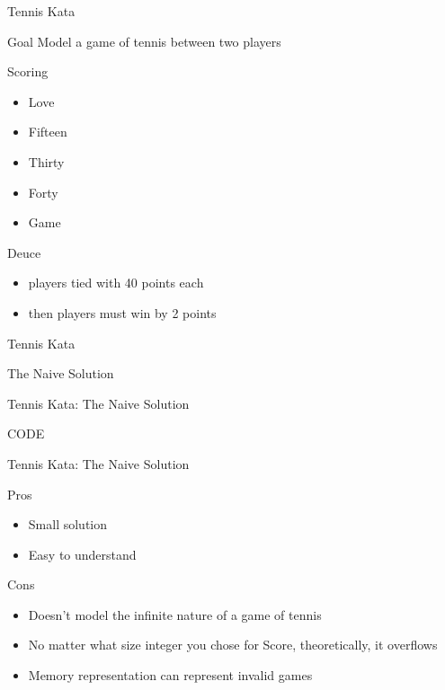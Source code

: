 \documentclass[aspectratio=169]{beamer}
\begin{document}
\begin{frame}{Tennis Kata}
\begin{block}{Goal}
Model a game of tennis between two players
\end{block}
\begin{block}{Scoring}
\begin{itemize}
\item Love
\item Fifteen
\item Thirty
\item Forty
\item Game
\end{itemize}
\end{block}
\begin{block}{Deuce}
\begin{itemize}
\item players tied with 40 points each
\item then players must win by 2 points
\end{itemize}
\end{block}
\end{frame}

\begin{frame}{Tennis Kata}
\begin{center}
\begin{Huge}The Naive Solution\end{Huge}
\end{center}
\end{frame}

\begin{frame}{Tennis Kata: The Naive Solution}
\begin{center}
\begin{Huge}
CODE
\end{Huge}
\end{center}
\end{frame}

\begin{frame}{Tennis Kata: The Naive Solution}
\begin{block}{Pros}
\begin{itemize}
\item Small solution
\item Easy to understand
\end{itemize}
\end{block}
\begin{block}{Cons}
\begin{itemize}
\item Doesn't model the infinite nature of a game of tennis
\item No matter what size integer you chose for Score, theoretically, it overflows
\item Memory representation can represent invalid games
\end{itemize}
\end{block}
\end{frame}
\end{document}
